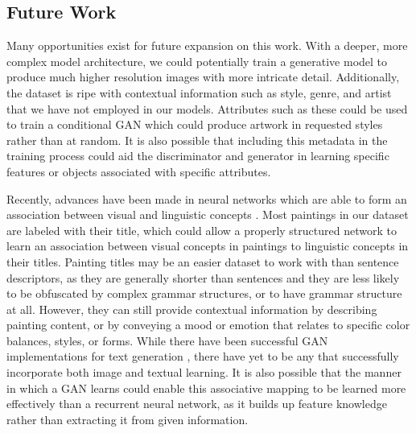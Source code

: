 \documentclass[10pt,twocolumn,letterpaper]{article}
\begin{document}
\subsection{Future Work}
Many opportunities exist for future expansion on this work. With a deeper, more complex model architecture, we could potentially train a generative model to produce much higher resolution images with more intricate detail. Additionally, the dataset is ripe with contextual information such as style, genre, and artist that we have not employed in our models. Attributes such as these could be used to train a conditional GAN \cite{mirza2014conditional} which could produce artwork in requested styles rather than at random. It is also possible that including this metadata in the training process could aid the discriminator and generator in learning specific features or objects associated with specific attributes.

Recently, advances have been made in neural networks which are able to form an association between visual and linguistic concepts \cite{ishibashi2018associative}. Most paintings in our dataset are labeled with their title, which could allow a properly structured network to learn an association between visual concepts in paintings to linguistic concepts in their titles. Painting titles may be an easier dataset to work with than sentence descriptors, as they are generally shorter than sentences and they are less likely to be obfuscated by complex grammar structures, or to have grammar structure at all. However, they can still provide contextual information by describing painting content, or by conveying a mood or emotion that relates to specific color balances, styles, or forms. While there have been successful GAN implementations for text generation \cite{zhang2017adversarial}, there have yet to be any that successfully incorporate both image and textual learning. It is also possible that the manner in which a GAN learns could enable this associative mapping to be learned more effectively than a recurrent neural network, as it builds up feature knowledge rather than extracting it from given information.

{\small


}
\end{document}
